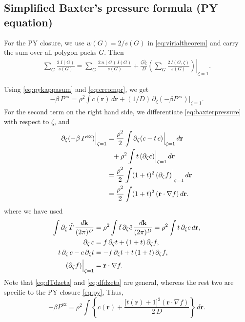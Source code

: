 \documentclass[preprint]{revtex4-1}
\newcommand{\vct}[1]{\mathbf{#1}}
\providecommand{\vr}{} %
\renewcommand{\vr}{\vct{r}}
\newcommand{\vk}{\vct{k}}
\newcommand{\dvk}{\frac{d\vk}{(2\pi)^D}}
\newcommand{\supex}[1]{ { { #1 }^{ \mathrm{ex} } } }
\newcommand{\Pex}{\supex{P}}
\begin{document}
\subsection{\label{sec:vtpy}Simplified Baxter's pressure formula (PY equation)}



For the PY closure, we use $w(G) = 2/s(G)$
in \eqref{eq:virialtheorem}
and carry the sum over all polygon packs $G$.
%
Then
%
\begin{align*}
  \sum_G \frac{ 2 \, I(G) } { s(G) }
  =
  \sum_G \frac{ 2 \, n(G) \, I(G) } { s(G) }
  + \frac{ \zeta \partial_\zeta }{ D }
    \left. \left(
    \sum_G \frac{ 2 \, I(G, \zeta) } { s(G) }
    \right) \right|_{\zeta = 1}.
\end{align*}


Using \eqref{eq:pykappasum} and \eqref{eq:crcompr}, we get
\begin{align}
  -\beta \, \Pex
  =
  \rho^2 \int c(\vr) \, d\vr
  + (1/D) \,
      \partial_\zeta \left( -\beta \Pex \right)
    \Big|_{\zeta = 1}.
\label{eq:pyPsimp1}
\end{align}
%
For the second term on the right hand side,
we differentiate \eqref{eq:baxterpressure} with respect to $\zeta$,
and
\begin{align*}
  \partial_\zeta (-\beta \, \Pex) \Big|_{\zeta=1}
&=
\frac{\rho^2}{2}
\int
  \partial_\zeta (c - t \, c)
  \Big|_{\zeta = 1} \, d\vr
\notag \\
&\hphantom{=}
+ \rho^2 \int t \, (\partial_\zeta c) \Big|_{\zeta = 1} \, d\vr
\\
&=
\frac{\rho^2}{2}
\int (1+t)^2 \, (\partial_\zeta f) \Big|_{\zeta = 1} \, d\vr \\
&=
\frac{\rho^2}{2}
\int (1+t)^2 \, (\vr \cdot \nabla f) \, d\vr.
\end{align*}
%
where we have used
\begin{align}
%
\int \partial_\zeta \, \tilde T \, \dvk
&=
  \rho^2 \int \tilde{t} \, \partial_\zeta \tilde{c} \, \dvk
=
  \rho^2 \int t \, \partial_\zeta c \, d\vr,
  \label{eq:dTdzeta} \\
%
  \partial_\zeta \, c
&=
  f \, \partial_\zeta t
  + (1 + t) \, \partial_\zeta f,
  \notag \\
%
  t \, \partial_\zeta \, c - c \, \partial_\zeta t
&=
  -f \, \partial_\zeta t
  + t \, (1 + t) \, \partial_\zeta f,
  \notag \\
%
  (\partial_\zeta f) \Big|_{\zeta = 1}
&= \vr \cdot \nabla f.
  \label{eq:dfdzeta}
\end{align}
%
Note that \eqref{eq:dTdzeta} and \eqref{eq:dfdzeta} are general,
whereas the rest two are specific to the PY closure \eqref{eq:py},
%
Thus,
\begin{equation}
  -\beta \Pex = \rho^2 \int
  \left\{ c(\vr)
    + \frac{ \big[ t(\vr) + 1 \big]^2 (\vr \cdot \nabla f) }
           { 2 \, D }
  \right\} \, d\vr.
  \label{eq:pyPsimplified}
\end{equation}
\end{document}
